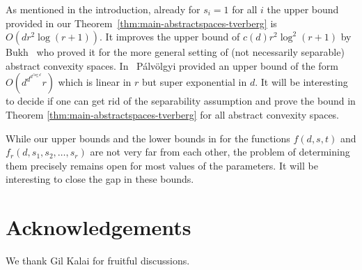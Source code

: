 \documentclass[11pt]{article}
\theoremstyle{plain}
\theoremstyle{definition}
\theoremstyle{remark}
\begin{document}
As mentioned in the introduction, already for $s_i=1$ for all $i$ the upper bound provided in our Theorem~\ref{thm:main-abstractspaces-tverberg} is $O(d r^2 \log (r+1))$. It improves the upper bound of $c(d)r^2 \log ^2 (r+1)$ by Bukh~\cite{Bukh2010} who proved it for the more general setting of (not necessarily separable) abstract convexity spaces. 
In~\cite{palvolgyi-radon} P\'alv\"olgyi provided an upper bound of the form $O(d^{d^{d^{\log d}}}r)$ which is linear in $r$ but super exponential in $d$.
It will be interesting to decide if one can get rid of the 
separability assumption and prove the bound in Theorem 
\ref{thm:main-abstractspaces-tverberg} for all
abstract convexity spaces.

While our upper bounds and the lower bounds
in \cite{ChenETAL2025}
for the functions $f(d,s,t)$ and $f_r(d,s_1,s_2, \ldots ,s_r)$ 
are not very far from each other, the problem of determining them 
precisely remains open for most values of the parameters. It 
will be interesting to close the gap in these bounds. 
 
\section*{Acknowledgements}
We thank Gil Kalai for fruitful discussions.
\end{document}
